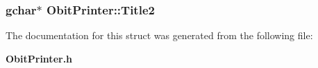\subsubsection{\setlength{\rightskip}{0pt plus 5cm}gchar$\ast$ {\bf Obit\-Printer::Title2}}\label{structObitPrinter_o15}




The documentation for this struct was generated from the following file:\begin{CompactItemize}
\item 
{\bf Obit\-Printer.h}\end{CompactItemize}
